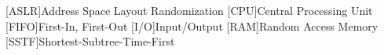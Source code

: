 [ASLR]{Address Space Layout Randomization}
[CPU]{Central Processing Unit}
[FIFO]{First-In, First-Out}
[I/O]{Input/Output}
[RAM]{Random Access Memory}
[SSTF]{Shortest-Subtree-Time-First}